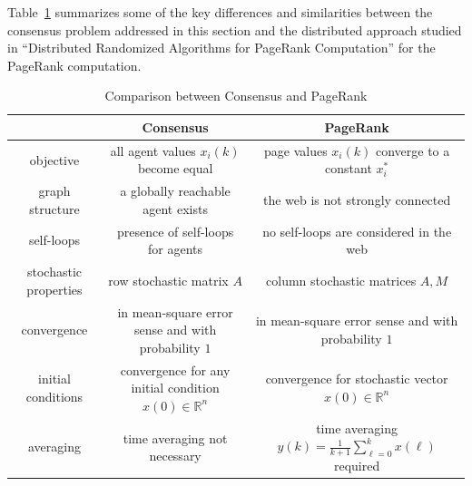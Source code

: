 \documentclass[11pt,draftcls,onecolumn]{IEEEtran}
\newtheorem{lemma}[theorem]{Lemma}
\newcommand{\field}[1]{{\mathbb{#1}}}
\newcommand{\R}{\field{R}}
\begin{document}
\medskip



Table~\ref{consensusandpagerank}
summarizes some of the key differences and similarities between the consensus
problem addressed in this section and the distributed approach studied 
in ``Distributed Randomized Algorithms for PageRank Computation''
for the PageRank computation.




\begin{table}[htb]
\caption{Comparison between Consensus and PageRank}
\label{consensusandpagerank}
\begin{tabular}{|c|c|c|} \hline
 & Consensus & PageRank \\ \hline
objective & all agent values $x_i(k)$ become equal & page values $x_i(k)$ converge to a constant $x_i^*$\\
graph structure & a globally reachable agent exists & the web is not strongly connected \\
self-loops & presence of self-loops for agents & no self-loops are considered in the web\\
stochastic properties &row stochastic matrix $A$ & column stochastic matrices $A, M$\\
convergence & in mean-square error sense and with probability $1$ & in mean-square error sense
and with probability $1$
\\
initial conditions & convergence for any initial condition  $x(0) \in \R^n$ & convergence for stochastic vector $x(0) \in \R^n$\\
averaging & time averaging not necessary & time averaging $y(k)= \frac{1}{k+1}\sum_{\ell=0}^{k} x(\ell)$ required \\
\hline
\end{tabular}
\end{table}
\end{document}
